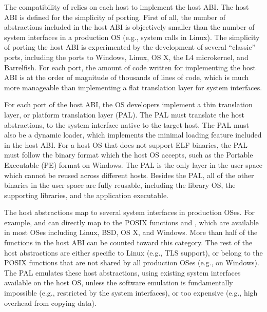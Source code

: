 The compatibility of \graphene{} relies on each host to implement the host ABI.
The host ABI is defined for the simplicity of porting.
First of all, the number of abstractions included in the host ABI
is objectively smaller than the number of system interfaces in a production OS (e.g., system calls in Linux). 
The simplicity of porting the host ABI is experimented by the development of
several ``classic'' ports, including the ports to Windows, Linux, OS X,  the L4 microkernel, and Barrelfish.
For each port, the amount of code written for implementing the host ABI is at the order of magnitude of thousands of lines of code, which is much more manageable than implementing a flat translation layer for system interfaces.


For each port of the host ABI, the OS developers implement a thin translation layer,
or platform translation layer (PAL). The PAL must translate the host abstractions, to the system interface native to the target host. 
The PAL must also be a dynamic loader, which implements the minimal loading feature included in the host ABI.
For a host OS that does not support ELF binaries, the PAL must follow the binary format which the host OS accepts, such as the Portable Executable (PE) format on Windows.
The PAL is the only layer in the user space which cannot be reused
across different hosts. Besides the PAL, all of the other binaries in the user space are fully reusable, including the library OS, the supporting libraries, and the application executable.



The host abstractions map to several system interfaces in production OSes.
For example,  and  can directly map to the POSIX functions  and , which are available in most OSes including Linux, BSD, OS X, and Windows.
More than half of the functions in the host ABI can be counted toward this category.
The rest of the host abstractions are either specific to Linux
(e.g., TLS support),
or belong to the POSIX functions that are not shared by all production OSes
(e.g.,  on Windows).
The PAL emulates these host abstractions, using existing system interfaces available on the host OS, unless the software emulation is fundamentally impossible (e.g., restricted by the system interfaces), or too expensive (e.g., high overhead from copying data).





